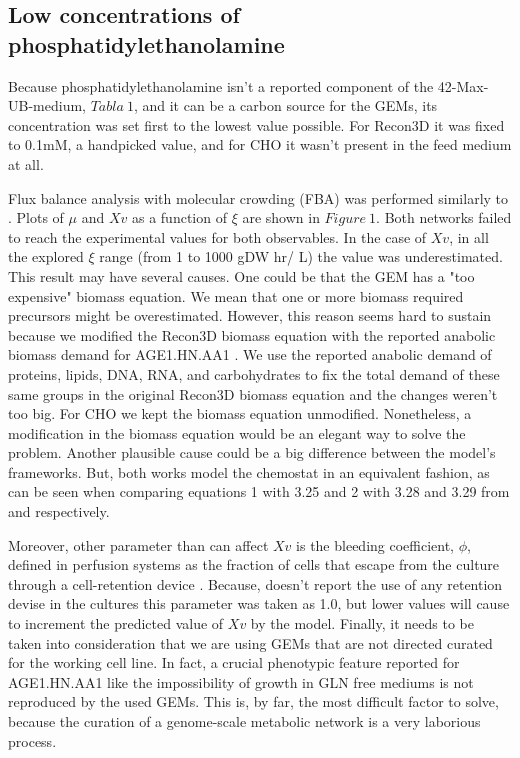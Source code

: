 \subsection{Low concentrations of phosphatidylethanolamine} 
	
	Because phosphatidylethanolamine isn't a reported component of the 42-Max-UB-medium, $Tabla\ 1$, and it can be a carbon source for the GEMs, its concentration was set first to the lowest value possible. For Recon3D it was fixed to 0.1mM, a handpicked value, and for CHO it wasn't present in the feed medium at all.
	
	Flux balance analysis with molecular crowding (FBA) was performed similarly to \cite{Fernandez-de-Cossio-Diaz2018b}. Plots of $\mu$ and $Xv$ as a function of $\xi$ are shown in $Figure\ 1$. Both networks failed to reach the experimental values for both observables. In the case of $Xv$, in all the explored $\xi$ range (from 1 to 1000 gDW hr/ L) the value was underestimated. This result may have several causes. One could be that the GEM has a "too expensive" biomass equation. We mean that one or more biomass required precursors might be overestimated. However, this reason seems hard to sustain because we modified the Recon3D biomass equation with the reported anabolic biomass demand for AGE1.HN.AA1 \cite{Niklas2013}. We use the reported anabolic demand of proteins, lipids, DNA, RNA, and carbohydrates to fix the total demand of these same groups in the original Recon3D biomass equation and the changes weren't too big. For CHO we kept the biomass equation unmodified. Nonetheless, a modification in the biomass equation would be an elegant way to solve the problem. Another plausible cause could be a big difference between the model's frameworks. But, both works model the chemostat in an equivalent fashion, as can be seen when comparing equations 1 with 3.25 and 2 with 3.28 and 3.29 from \cite{Fernandez-de-Cossio-Diaz2017} and \cite{Rath2017a} respectively.
	 
	Moreover, other parameter than can affect $Xv$ is the bleeding coefficient, $\phi$,
	defined in perfusion systems as the fraction of cells that escape from the culture through a cell-retention device \cite{Fernandez-de-Cossio-Diaz2017}. Because, \cite{Rath2017a} doesn't report the use of any retention devise in the cultures this parameter was taken as 1.0, but lower values will cause to increment the predicted value of  $Xv$ by the model. Finally, it needs to be taken into consideration that we are using GEMs that are not directed curated for the working cell line. In fact, a crucial phenotypic feature reported for AGE1.HN.AA1 like the impossibility of growth in GLN free mediums \cite{Rath2017a} is not reproduced by the used GEMs. This is, by far, the most difficult factor to solve, because the curation of a genome-scale metabolic network is a very laborious process.

